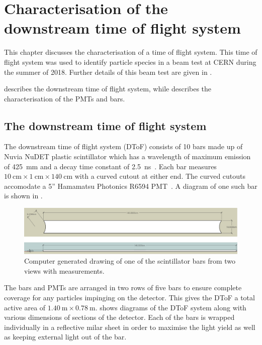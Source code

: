 \chapter{Characterisation of the downstream time of flight system}
\label{sec:hptpc_dtof_characterisation}

This chapter discusses the characterisation of a time of flight system.
This time of flight system was used to identify particle species in a beam test at CERN during the summer of 2018.
Further details of this beam test are given in .

 describes the downstream time of flight system, while  describes the characterisation of the PMTs and bars.

\section{The downstream time of flight system}
\label{sec:hptpc_dtof_characterisation:dtof}

The downstream time of flight system (DToF) consists of 10 bars made up of Nuvia NuDET plastic scintillator which has a wavelength of maximum emission of \SI{425}{\milli\metre} and a decay time constant of \SI{2.5}{\nano\second}~\cite{nuvia}.
Each bar measures $\SI{10}{\centi\metre} \times \SI{1}{\centi\metre} \times \SI{140}{\centi\metre}$ with a curved cutout at either end.
The curved cutouts accomodate a 5'' Hamamatsu Photonics R6594 PMT~\cite{hamamatsu}.
A diagram of one such bar is shown in .

\begin{figure}
  \centering
  \includegraphics[width=.8\linewidth]{files/figures/hptpc_dtof_characterisation/barDiag}
  \caption[HPTPC DToF bar diagram]{Computer generated drawing of one of the scintillator bars from two views with measurements.}
  \label{fig:barDiag}
\end{figure}

The bars and PMTs are arranged in two rows of five bars to ensure complete coverage for any particles impinging on the detector.
This gives the DToF a total active area of $\SI{1.40}{\metre} \times \SI{0.78}{\metre}$.
 shows diagrams of the DToF system along with various dimensions of sections of the detector.
Each of the bars is wrapped individually in a reflective milar sheet in order to maximise the light yield as well as keeping external light out of the bar.

